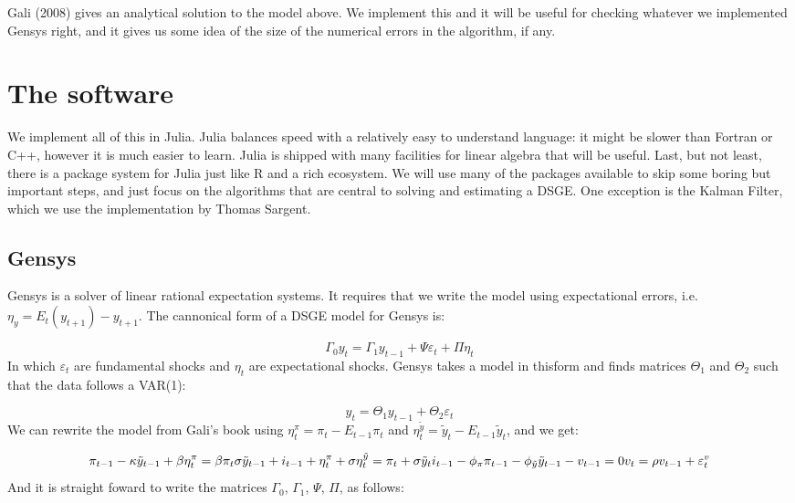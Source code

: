 \documentclass[12pt,a4paper]{article}
\begin{document}
Gali (2008) gives an analytical solution to the model above. We implement this and it will be useful for checking whatever we implemented Gensys right, and it gives us some idea of the size of the numerical errors in the algorithm, if any.

\section{The software}
We implement all of this in Julia. Julia balances speed with a relatively easy to understand language: it might be slower than Fortran or C++, however it is much easier to learn. Julia is shipped with many facilities for linear algebra that will be useful. Last, but not least, there is a package system for Julia just like R and a rich ecosystem. We will use many of the packages available to skip some boring but important steps, and just focus on the algorithms that are central to solving and estimating a DSGE. One exception is the Kalman Filter, which we use the implementation by Thomas Sargent.

\subsection{Gensys}
Gensys is a solver of linear rational expectation systems. It requires that we write the model using expectational errors, i.e. $\eta_y = E_{t}(y_{t+1}) - y_{t+1}$. The cannonical form of a DSGE model for Gensys is:

\[
\Gamma_0 y_t = \Gamma_1 y_{t-1} + \Psi \varepsilon_t + \Pi \eta_t
\]
In which $\varepsilon_t$ are fundamental shocks and $\eta_t$ are expectational shocks. Gensys takes a model in thisform and finds matrices $\Theta_1$ and $\Theta_2$ such that the data follows a VAR(1):

\[
y_t = \Theta_1 y_{t-1} + \Theta_2 \varepsilon_t
\]
We can rewrite the model from Gali's book using $\eta_t^{\pi} = \pi_t - E_{t-1} \pi_t$ and $\eta_t^{\tilde{y}} = \tilde{y}_t - E_{t-1} \tilde{y}_t$, and we get:

\[
\pi_{t-1} - \kappa \tilde{y}_{t-1} + \beta \eta_t^{\pi} = \beta \pi_t\\
\sigma\tilde{y}_{t-1} + i_{t-1} + \eta_t^{\pi} + \sigma \eta_t^{\tilde{y}} = \pi_t + \sigma \tilde{y}_t\\
i_{t-1} - \phi_{\pi}\pi_{t-1} - \phi_{\tilde{y}} \tilde{y}_{t-1} - v_{t-1} = 0\\
v_t = \rho v_{t-1} + \varepsilon^v_t
\]
And it is straight foward to write the matrices $\Gamma_0$, $\Gamma_1$, $\Psi$, $\Pi$, as follows:
\end{document}
